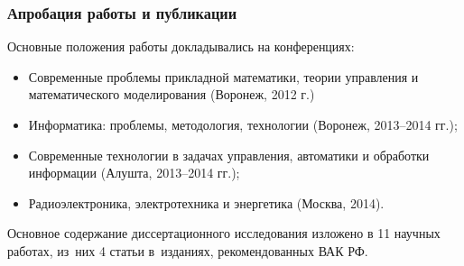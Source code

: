 \documentclass[12pt]{beamer}
\begin{document}
\begin{frame}
  \frametitle{Апробация работы и публикации}
  Основные положения работы докладывались на конференциях:
  \begin{itemize}
    \item Современные проблемы прикладной математики, теории управления и математического моделирования (Воронеж, 2012 г.)
    \item Информатика: проблемы, методология, технологии (Воронеж, 2013--2014 гг.);
    \item Современные технологии в задачах управления, автоматики и обработки информации (Алушта, 2013--2014 гг.);
    \item Радиоэлектроника, электротехника и энергетика (Москва, 2014).
  \end{itemize}
  Основное содержание диссертационного исследования изложено в 11 научных работах, из~них 4 статьи в~изданиях, рекомендованных ВАК РФ.
\end{frame}
\end{document}
